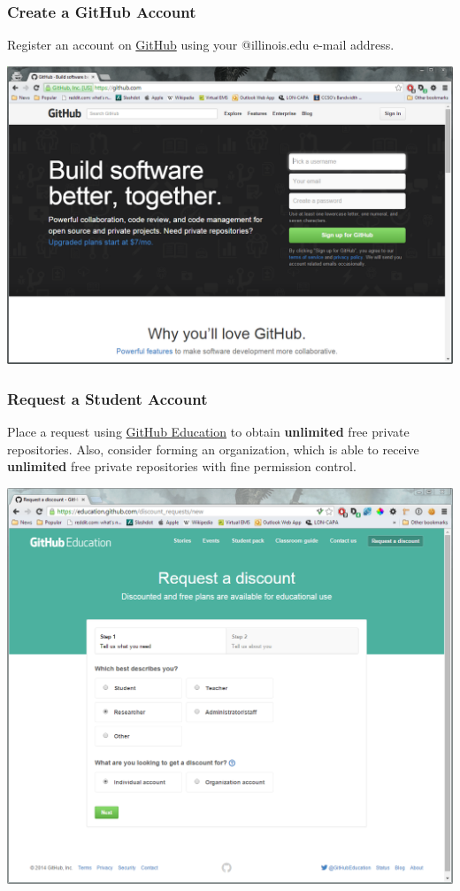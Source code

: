 \documentclass{beamer}\usepackage[]{graphicx}\usepackage[]{color}
\begin{document}
\begin{frame}
\frametitle{Create a GitHub Account}

Register an account on \href{http://github.com}{GitHub} using your @illinois.edu e-mail address.
\begin{center}
\includegraphics[scale=0.32]{img/git/github_reg.png}
\end{center}

\end{frame}

\begin{frame}
\frametitle{Request a Student Account}

Place a request using \href{https://education.github.com/discount_requests}{GitHub Education} to obtain \textbf{unlimited} free private repositories. Also, consider forming an organization, which is able to receive \textbf{unlimited} free private repositories with fine permission control. 
\begin{center}
\includegraphics[scale=0.23]{img/git/ed_discount.png}
\end{center}

\end{frame}
\end{document}

